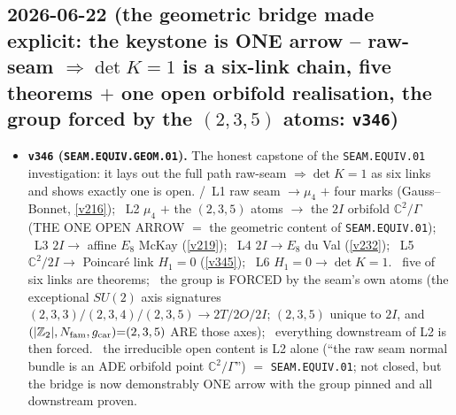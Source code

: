 \subsection*{2026-06-22 (the geometric bridge made explicit: the keystone is ONE arrow -- raw-seam $\Rightarrow\det K{=}1$ is a six-link chain, five theorems $+$ one open orbifold realisation, the group forced by the $(2,3,5)$ atoms: \texttt{v346})}
\begin{itemize}
\item \textbf{\texttt{v346} (\texttt{SEAM.EQUIV.GEOM.01}).} The honest capstone of the \texttt{SEAM.EQUIV.01}
investigation: it lays out the full path raw-seam $\Rightarrow\det K{=}1$ as six links and shows exactly one is open.
\mE/\mC\ L1 raw seam $\to\mu_4$ $+$ four marks (Gauss--Bonnet, \vref{v216}); \mO\ L2 $\mu_4$ $+$ the $(2,3,5)$ atoms
$\to$ the $2I$ orbifold $\mathbb{C}^2/\Gamma$ (THE ONE OPEN ARROW $=$ the geometric content of \texttt{SEAM.EQUIV.01});
\mE\ L3 $2I\to$ affine $E_8$ McKay (\vref{v219}); \mE\ L4 $2I\to E_8$ du Val (\vref{v232}); \mE\ L5
$\mathbb{C}^2/2I\to$ Poincar\'e link $H_1{=}0$ (\vref{v345}); \mE\ L6 $H_1{=}0\to\det K{=}1$. \mE\ five of six links
are theorems; \mE\ the group is FORCED by the seam's own atoms (the exceptional $SU(2)$ axis signatures
$(2,3,3)/(2,3,4)/(2,3,5)\to 2T/2O/2I$; $(2,3,5)$ unique to $2I$, and $(|\mathbb{Z}_2|,N_{\mathrm{fam}},g_{\mathrm{car}}){=}(2,3,5)$ ARE those
axes); \mE\ everything downstream of L2 is then forced. \mO\ the irreducible open content is L2 alone (``the raw
seam normal bundle is an ADE orbifold point $\mathbb{C}^2/\Gamma$'') $=$ \texttt{SEAM.EQUIV.01}; not closed, but the
bridge is now demonstrably ONE arrow with the group pinned and all downstream proven.
\end{itemize}

